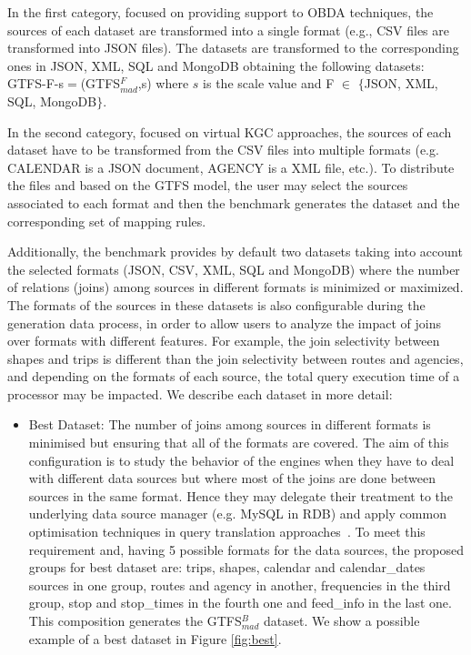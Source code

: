 \begin{enumerate}[label=\textbf{\arabic*})]
    In the first category, focused on providing support to OBDA techniques, the sources of each dataset are transformed into a single format (e.g., CSV files are transformed into JSON files). The datasets are transformed to the corresponding ones in JSON, XML, SQL and MongoDB obtaining the following datasets: GTFS-F-s$=$(GTFS$_{mad}^{F}$,s) where $s$ is the scale value and F $\in$ $\{$JSON, XML, SQL, MongoDB$\}$. 
    
    In the second category, focused on virtual KGC approaches, the sources of each dataset have to be transformed from the CSV files into multiple formats (e.g. CALENDAR is a JSON document, AGENCY is a XML file, etc.). To distribute the files and based on the GTFS model, the user may select the sources associated to each format and then the benchmark generates the dataset and the corresponding set of mapping rules. 
    
    Additionally, the benchmark provides by default two datasets taking into account the selected formats (JSON, CSV, XML, SQL and MongoDB) where the number of relations (joins) among sources in different formats is minimized or maximized. The formats of the sources in these datasets is also configurable during the generation data process, in order to allow users to analyze the impact of joins over formats with different features. For example, the join selectivity between shapes and trips is different than the join selectivity between routes and agencies, and depending on the formats of each source, the total query execution time of a processor may be impacted. We describe each dataset in more detail:
    \begin{itemize}
        \item Best Dataset: The number of joins among sources in different formats is minimised but ensuring that all of the formats are covered. The aim of this configuration is to study the behavior of the engines when they have to deal with different data sources but where most of the joins are done between sources in the same format. Hence they may delegate their treatment to the underlying data source manager (e.g. MySQL in RDB) and apply common optimisation techniques in query translation approaches~\citep{priyatna2014formalisation}. To meet this requirement and, having 5 possible formats for the data sources, the proposed groups for best dataset are: trips, shapes, calendar and calendar\_dates sources in one group, routes and agency in another, frequencies in the third group, stop and stop\_times in the fourth one and feed\_info in the last one. This composition generates the GTFS$_{mad}^{B}$ dataset. We show a possible example of a best dataset in Figure \ref{fig:best}. 
       

\end{itemize}
\end{enumerate}
